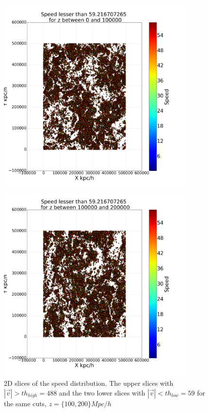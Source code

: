 \documentclass[12pt]{article}
\begin{document}
\begin{figure}[ht]
\begin{minipage}{.45\textwidth}
\end{minipage}
\begin{minipage}{.45\textwidth}
  \centering
  \includegraphics[width=0.9\textwidth]{graphs/scatter_magnitud_vel_59_lz_100000.png}
\end{minipage}
\begin{minipage}{.45\textwidth}
  \centering
  \includegraphics[width=0.9\textwidth]{graphs/scatter_magnitud_vel_59_lz_200000.png}
\end{minipage}
\caption{2D slices of the speed distribution. The upper slices with $|\vec{v}| > th_{high} = 488$ and the two lower slices with $|\vec{v}| < th_{low} = 59$ for the same cuts, $z = \{100, 200 \} Mpc/h$  }\label{fig:2D_slices_thresh}
\end{figure}
\FloatBarrier
\end{document}
